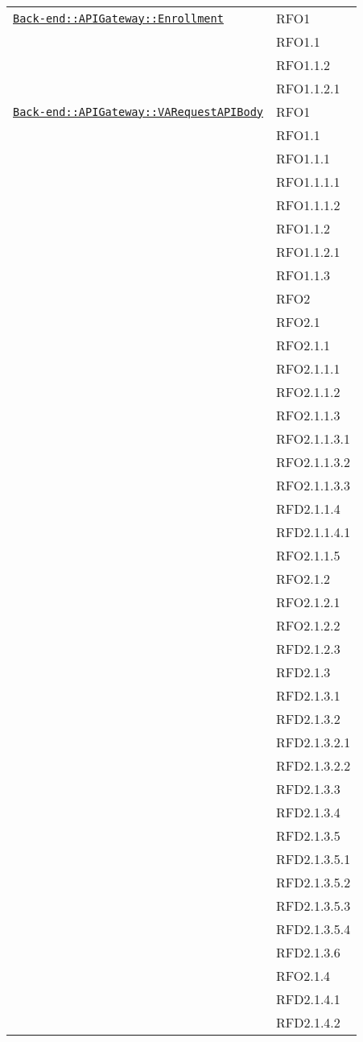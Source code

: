 \begin{longtable}{|>{\centering}m{10cm}|m{3cm}<{\centering}|}
\hyperref[Back-end::APIGateway::Enrollment]{\texttt{Back-end::APIGateway::Enrollment}} & RFO1\\
& RFO1.1\\
& RFO1.1.2\\
& RFO1.1.2.1\\ \hline

\hyperref[Back-end::APIGateway::VARequestAPIBody]{\texttt{Back-end::APIGateway::VARequestAPIBody}} & RFO1\\
& RFO1.1\\
& RFO1.1.1\\
& RFO1.1.1.1\\
& RFO1.1.1.2\\
& RFO1.1.2\\
& RFO1.1.2.1\\
& RFO1.1.3\\
& RFO2\\
& RFO2.1\\
& RFO2.1.1\\
& RFO2.1.1.1\\
& RFO2.1.1.2\\
& RFO2.1.1.3\\
& RFO2.1.1.3.1\\
& RFO2.1.1.3.2\\
& RFO2.1.1.3.3\\
& RFD2.1.1.4\\
& RFD2.1.1.4.1\\
& RFO2.1.1.5\\
& RFO2.1.2\\
& RFO2.1.2.1\\
& RFO2.1.2.2\\
& RFD2.1.2.3\\
& RFD2.1.3\\
& RFD2.1.3.1\\
& RFD2.1.3.2\\
& RFD2.1.3.2.1\\
& RFD2.1.3.2.2\\
& RFD2.1.3.3\\
& RFD2.1.3.4\\
& RFD2.1.3.5\\
& RFD2.1.3.5.1\\
& RFD2.1.3.5.2\\
& RFD2.1.3.5.3\\
& RFD2.1.3.5.4\\
& RFD2.1.3.6\\
& RFO2.1.4\\
& RFD2.1.4.1\\
& RFD2.1.4.2\\

\end{longtable}
